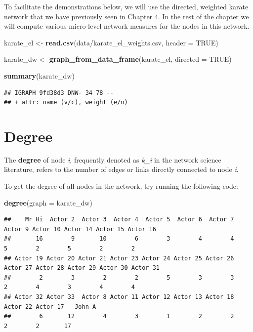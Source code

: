 \documentclass[
]{book}
\newenvironment{Shaded}{\begin{snugshade}}{\end{snugshade}}
\newcommand{\AttributeTok}[1]{\textcolor[rgb]{0.13,0.29,0.53}{#1}}
\newcommand{\ConstantTok}[1]{\textcolor[rgb]{0.56,0.35,0.01}{#1}}
\newcommand{\FunctionTok}[1]{\textcolor[rgb]{0.13,0.29,0.53}{\textbf{#1}}}
\newcommand{\NormalTok}[1]{#1}
\newcommand{\OtherTok}[1]{\textcolor[rgb]{0.56,0.35,0.01}{#1}}
\newcommand{\StringTok}[1]{\textcolor[rgb]{0.31,0.60,0.02}{#1}}
\begin{document}
To facilitate the demonstrations below, we will use the directed, weighted karate network that we have previously seen in Chapter 4. In the rest of the chapter we will compute various micro-level network measures for the nodes in this network.

\begin{Shaded}
\begin{Highlighting}[]
\NormalTok{karate\_el }\OtherTok{\textless{}{-}} \FunctionTok{read.csv}\NormalTok{(}\StringTok{\textquotesingle{}data/karate\_el\_weights.csv\textquotesingle{}}\NormalTok{, }\AttributeTok{header =} \ConstantTok{TRUE}\NormalTok{)}

\NormalTok{karate\_dw }\OtherTok{\textless{}{-}} \FunctionTok{graph\_from\_data\_frame}\NormalTok{(karate\_el, }\AttributeTok{directed =} \ConstantTok{TRUE}\NormalTok{)}

\FunctionTok{summary}\NormalTok{(karate\_dw)}
\end{Highlighting}
\end{Shaded}

\begin{verbatim}
## IGRAPH 9fd38d3 DNW- 34 78 -- 
## + attr: name (v/c), weight (e/n)
\end{verbatim}

\section{Degree}\label{degree}

The \textbf{degree} of node \emph{i}, frequently denoted as \emph{k\_i} in the network science literature, refers to the number of edges or links directly connected to node \emph{i}.

To get the degree of all nodes in the network, try running the following code:

\begin{Shaded}
\begin{Highlighting}[]
\FunctionTok{degree}\NormalTok{(}\AttributeTok{graph =}\NormalTok{ karate\_dw)}
\end{Highlighting}
\end{Shaded}

\begin{verbatim}
##    Mr Hi  Actor 2  Actor 3  Actor 4  Actor 5  Actor 6  Actor 7  Actor 9 Actor 10 Actor 14 Actor 15 Actor 16 
##       16        9       10        6        3        4        4        5        2        5        2        2 
## Actor 19 Actor 20 Actor 21 Actor 23 Actor 24 Actor 25 Actor 26 Actor 27 Actor 28 Actor 29 Actor 30 Actor 31 
##        2        3        2        2        5        3        3        2        4        3        4        4 
## Actor 32 Actor 33  Actor 8 Actor 11 Actor 12 Actor 13 Actor 18 Actor 22 Actor 17   John A 
##        6       12        4        3        1        2        2        2        2       17
\end{verbatim}
\end{document}
